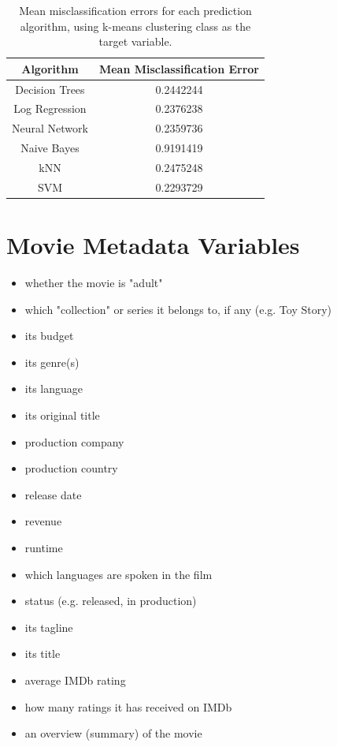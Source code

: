 \documentclass[12pt,english]{article}
\begin{document}
\begin{table}[t]
\centering
\begin{tabular}{c|c}
  Algorithm   &  Mean Misclassification Error \\
  \hline \hline
    Decision Trees & 0.2442244 \\
    \hline
    Log Regression & 0.2376238  \\
    \hline
    Neural Network & 0.2359736  \\
    \hline
    Naive Bayes & 0.9191419 \\
    \hline
    kNN & 0.2475248 \\
    \hline
    SVM & 0.2293729   \\ 
    \hline
\end{tabular}
\caption{Mean misclassification errors for each prediction algorithm, using k-means clustering class as the target variable.}
\label{table 2}
\end{table}

\pagebreak
\appendix
\appendixpage
\section{Movie Metadata Variables}
\begin{singlespace}
\begin{itemize}
         \item whether the movie is "adult"
        \item which "collection" or series it belongs to, if any (e.g. Toy Story)
        \item its budget
        \item its genre(s)
        \item its language
        \item its original title
        \item production company
        \item production country
        \item release date
        \item revenue
        \item runtime
        \item which languages are spoken in the film
        \item status (e.g. released, in production)
        \item its tagline
        \item its title
        \item average IMDb rating
        \item how many ratings it has received on IMDb
        \item an overview (summary) of the movie
\end{itemize}
\end{singlespace}
\end{document}
